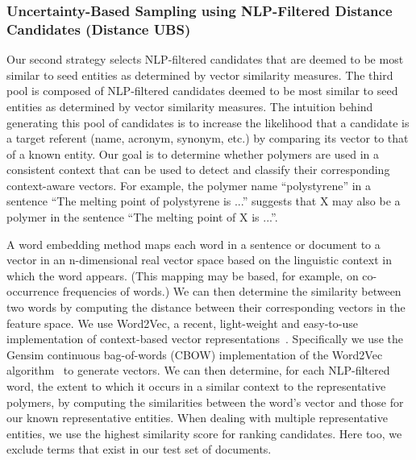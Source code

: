 \subsubsection{Uncertainty-Based Sampling using NLP-Filtered Distance Candidates (Distance UBS)}
Our second strategy selects NLP-filtered candidates that are 
deemed to be most similar to seed entities as determined by vector similarity measures.
The third pool is composed of NLP-filtered candidates deemed to be most similar to seed entities as determined by vector similarity measures.
The intuition behind generating this pool of candidates is to increase the likelihood that a candidate is a target referent (name, acronym, synonym, etc.) by comparing its vector to that of a known entity.
Our goal is to determine whether polymers are used in a consistent context that can be used to detect and classify their corresponding context-aware vectors.
For example, the polymer name ``polystyrene'' in a sentence ``The
melting point of polystyrene is ...'' suggests that X may also be a polymer in the
sentence ``The melting point of X is ...''.


A word embedding method  
maps each word
in a sentence or document to a vector in an n-dimensional real vector space
based on the linguistic context in which the word appears. (This mapping may
be based, for example, on co-occurrence frequencies of words.) 
We can then
determine the similarity between two words by computing the distance between
their corresponding vectors in the feature space.
We use Word2Vec, a recent, light-weight and easy-to-use implementation of context-based vector representations~\cite{mikolov2013efficient,mikolov2013distributed}.
Specifically we use the Gensim continuous bag-of-words
(CBOW) implementation of the Word2Vec
algorithm~\cite{rehurek2010software} to generate vectors.
We can then determine, for each NLP-filtered word, the extent to which it occurs
in a similar context to the representative polymers, by computing the similarities
between the word's vector and those for our known representative entities. 
When dealing with multiple representative entities, we use the highest similarity score for ranking candidates.
Here too, we exclude terms that exist in our test set of documents.

